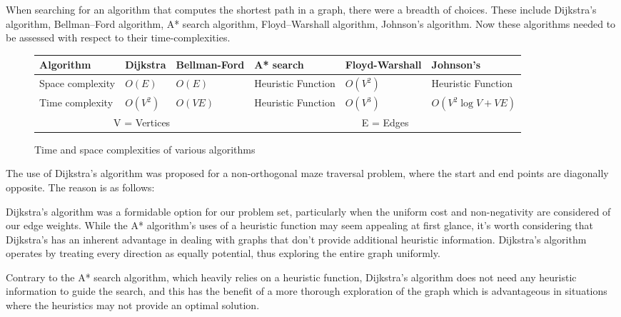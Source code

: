 When searching for an algorithm that computes the shortest path in a graph,  there were a breadth of choices. These include Dijkstra's algorithm, Bellman–Ford algorithm, A* search algorithm, Floyd–Warshall algorithm, Johnson's algorithm. Now these algorithms needed to be assessed with respect to their time-complexities.
\begin{figure}
    \centering
    \begin{tabular}{ | p{2cm} | p{2cm} | p{2cm} | p{2cm} | p{2cm} | p{2cm} |}

        \hline
        Algorithm           & Dijkstra     & Bellman-Ford & A* search          & Floyd-Warshall & Johnson's           \\
        \hline
        Space complexity    & \(O(E)\)       & \(O(E)\)       & Heuristic Function & \(O(V^2)\)       & Heuristic Function  \\
        \hline
        Time complexity     & \(O(V^2)\)     & \(O(VE)\)      & Heuristic Function & \(O(V^3)\)       & \(O(V^2 \log V + VE)\) \\
        \hline
        \multicolumn{3}{|c|}{V = Vertices} & \multicolumn{3}{c|}{E = Edges} \\
        \hline
    \end{tabular}
    \caption{Time and space complexities of various algorithms}
    \label{tbl:algorithm-complexities}
\end{figure}

The use of Dijkstra's algorithm was proposed for a non-orthogonal maze traversal problem, where the start and end points are diagonally opposite. The reason is as follows:

Dijkstra's algorithm was a formidable option for our problem set, particularly when the uniform cost and non-negativity are considered of our edge weights. While the A* algorithm's uses of a heuristic function may seem appealing at first glance, it’s worth considering that Dijkstra’s has an inherent advantage in dealing with graphs that don't provide additional heuristic information. Dijkstra's algorithm operates by treating every direction as equally potential, thus exploring the entire graph uniformly.

Contrary to the A* search algorithm, which heavily relies on a heuristic function, Dijkstra's algorithm does not need any heuristic information to guide the search, and this has the benefit of a more thorough exploration of the graph which is advantageous in situations where the heuristics may not provide an optimal solution.

